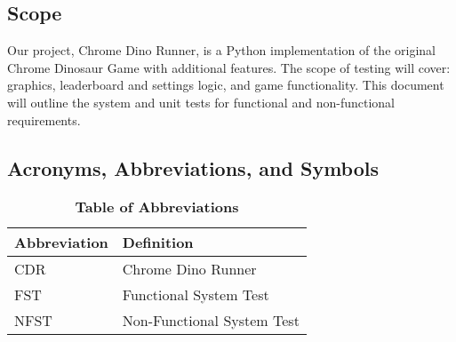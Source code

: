 \documentclass[12pt, titlepage]{article}
\begin{document}
	\subsection{Scope}
	Our project, Chrome Dino Runner, is a Python implementation of the original Chrome Dinosaur Game with additional features. The scope of testing will cover: graphics, leaderboard and settings logic, and game functionality. This document will outline the system and unit tests for functional and non-functional requirements. 
	
	\subsection{Acronyms, Abbreviations, and Symbols}
	
	\begin{table}[H]
		\caption{\textbf{Table of Abbreviations}} \label{Table}
		
		\begin{tabularx}{\textwidth}{p{3cm}X}
			\toprule
			\textbf{Abbreviation} & \textbf{Definition} \\
			\midrule
			CDR & Chrome Dino Runner\\
			FST & Functional System Test\\
			NFST & Non-Functional System Test\\
			\bottomrule
		\end{tabularx}
		
	\end{table}
	
\end{document}
